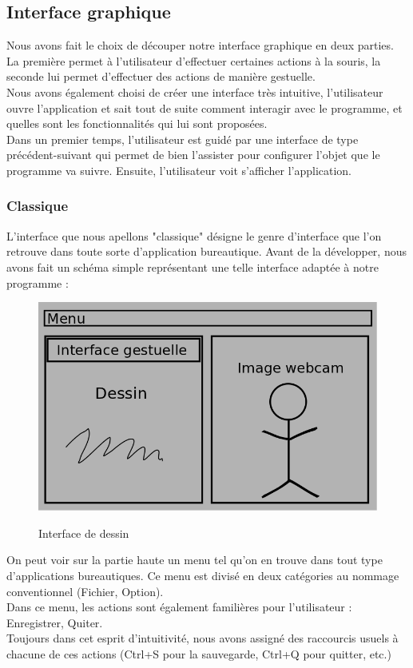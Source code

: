 \documentclass{report}
\begin{document}
		\subsection{Interface graphique}
			Nous avons fait le choix de découper notre interface graphique en deux parties. La première permet à l'utilisateur d'effectuer certaines actions à la souris, la seconde lui permet d'effectuer des actions de manière gestuelle. \\
			Nous avons également choisi de créer une interface très intuitive, l'utilisateur ouvre l'application et sait tout de suite comment interagir avec le programme, et quelles sont les fonctionnalités qui lui sont proposées. \\
			Dans un premier temps, l'utilisateur est guidé par une interface de type précédent-suivant qui permet de bien l'assister pour configurer l'objet que le programme va suivre. Ensuite, l'utilisateur voit s'afficher l'application.
			\subsubsection{Classique}
				L'interface que nous apellons "classique" désigne le genre d'interface que l'on retrouve dans toute sorte d'application bureautique. Avant de la développer, nous avons fait un schéma simple représentant une telle interface adaptée à notre programme : \\
			\begin{figure}[!h]
						\centering
						\includegraphics[scale=0.4]{../images/interface.png}\\
						\caption{Interface de dessin}
						\label{Interface de dessin}
			\end{figure}
			
			On peut voir sur la partie haute un menu tel qu'on en trouve dans tout type d'applications bureautiques. Ce menu est divisé en deux catégories au nommage conventionnel (Fichier, Option). \\
			Dans ce menu, les actions sont également familières pour l'utilisateur : Enregistrer, Quiter. \\
			Toujours dans cet esprit d'intuitivité, nous avons assigné des raccourcis usuels à chacune de ces actions (Ctrl+S pour la sauvegarde, Ctrl+Q pour quitter, etc.)
			
\end{document}
